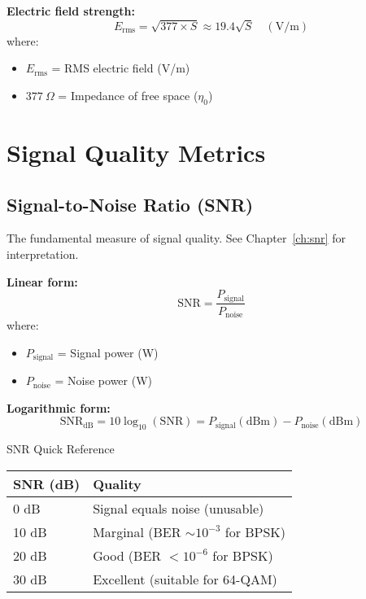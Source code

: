 \textbf{Electric field strength:}
\begin{equation}
E_{\text{rms}} = \sqrt{377 \times S} \approx 19.4\sqrt{S} \quad (\text{V/m})
\label{eq:field-strength}
\end{equation}
where:
\begin{itemize}
\item $E_{\text{rms}}$ = RMS electric field (V/m)
\item $377\ \Omega$ = Impedance of free space ($\eta_0$)
\end{itemize}

\section{Signal Quality Metrics}
\label{sec:signal-quality}

\subsection{Signal-to-Noise Ratio (SNR)}
\label{sec:snr}

The fundamental measure of signal quality. See Chapter~\ref{ch:snr} for interpretation.

\textbf{Linear form:}
\begin{equation}
\text{SNR} = \frac{P_{\text{signal}}}{P_{\text{noise}}}
\label{eq:snr-linear}
\end{equation}
where:
\begin{itemize}
\item $P_{\text{signal}}$ = Signal power (W)
\item $P_{\text{noise}}$ = Noise power (W)
\end{itemize}

\textbf{Logarithmic form:}
\begin{equation}
\text{SNR}_{\text{dB}} = 10\log_{10}(\text{SNR}) = P_{\text{signal}}(\text{dBm}) - P_{\text{noise}}(\text{dBm})
\label{eq:snr-db}
\end{equation}

\begin{calloutbox}{SNR Quick Reference}
\begin{tabular}{@{}ll@{}}
\toprule
SNR (dB) & Quality \\
\midrule
0 dB & Signal equals noise (unusable) \\
10 dB & Marginal (BER $\sim 10^{-3}$ for BPSK) \\
20 dB & Good (BER $< 10^{-6}$ for BPSK) \\
30 dB & Excellent (suitable for 64-QAM) \\
\bottomrule
\end{tabular}
\end{calloutbox}

